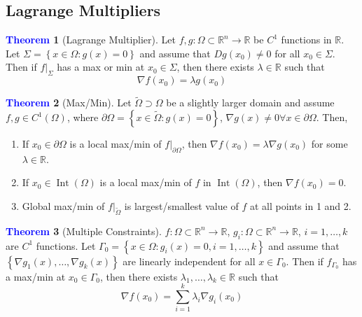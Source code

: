\documentclass[11pt]{article}
\theoremstyle{definition}
\theoremstyle{definition}
\newcommand{\R}[0]{\mathbb{R}}
\newtheorem{theorem}{\textcolor{blue}{Theorem}}
\theoremstyle{definition}
\theoremstyle{remark}
\begin{document}
\subsection{Lagrange Multipliers}

\begin{theorem}[Lagrange Multiplier]
    Let $f, g : \Omega \subset \R^n \to \R$ be $C^1$ functions in $\R$. Let $\Sigma = 
    \left\{ x \in \Omega : g(x) = 0 \right\} $ and assume that $Dg(x_0) \neq 0$ for all
    $x_0 \in \Sigma$. Then if $f|_\Sigma$ has a max or min at $x_0 \in \Sigma$, then there
    exists $\lambda \in \R$ such that 
    \[
        \nabla f(x_0) = \lambda g(x_0)
    \]         
\end{theorem}

\begin{theorem}[Max/Min]
    Let $\tilde{\Omega} \supset \Omega$ be a slightly larger domain and assume $f, g \in C^1(\Omega)$,
    where $\partial \Omega = \left\{ x \in \tilde{\Omega} : g(x) = 0 \right\} $, $\nabla g(x) \neq 0
    \forall x \in \partial \Omega$.
    Then,
    \begin{enumerate}
        \item If $x_0 \in \partial \Omega$ is a local max/min of $f|_{\partial \Omega}$, then
        $\nabla f(x_0) = \lambda \nabla g(x_0)$ for some $\lambda \in \R$.
        \item If $x_0 \in \operatorname{Int}(\Omega)$ is a local max/min of $f$ in 
        $\operatorname{Int}(\Omega)$, then $\nabla f(x_0) = 0$.
        \item Global max/min of $f|_{\tilde{\Omega}}$ is largest/smallest value of $f$ at all points
        in 1 and 2.         
    \end{enumerate}   
\end{theorem}

\begin{theorem}[Multiple Constraints]
    $f : \Omega \subset \R^n \to \R$, $g_i : \Omega \subset \R^n \to \R$, $i = 1, \dots, k$ are $C^1$ 
    functions. Let $\Gamma_0 = \left\{ x \in \Omega : g_i(x) = 0, i = 1, \dots, k \right\} $
    and assume that $\left\{ \nabla g_1(x), \dots, \nabla g_k(x) \right\} $ are linearly
    independent for all $x \in \Gamma_0$. Then if $f_{\Gamma_0}$ has a max/min at
    $x_0 \in \Gamma_0$, then there exists $\lambda_1, \dots, \lambda_k \in \R$ such that
    \[
        \nabla f(x_0) = \sum_{i = 1}^k \lambda_i \nabla g_i(x_0)
    \]     
    
\end{theorem}
\end{document}
